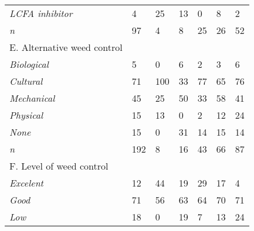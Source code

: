 \documentclass[
  12pt,
  a4paper]{article}
\begin{document}
\begin{table}[ht!]
\begin{tabular}{@{}lllllll@{}}
\hspace{3mm}\textit{LCFA inhibitor}                & 4      & 25    & 13        & 0       & 8         & 2     \\
\hspace{3mm}\textit{n}                             & 97     & 4     & 8         & 25      & 26        & 52    \\
E. Alternative weed control            &        &       &           &         &           &       \\
\hspace{3mm}\textit{Biological}                    & 5      & 0     & 6         & 2       & 3         & 6     \\
\hspace{3mm}\textit{Cultural}                      & 71     & 100   & 33        & 77      & 65        & 76    \\
\hspace{3mm}\textit{Mechanical}                    & 45     & 25    & 50        & 33      & 58        & 41    \\
\hspace{3mm}\textit{Physical}                               & 15     & 13    & 0         & 2       & 12        & 24    \\
\hspace{3mm}\textit{None}                                   & 15     & 0     & 31        & 14      & 15        & 14    \\
\hspace{3mm}\textit{n}                                      & 192    & 8     & 16        & 43      & 66        & 87    \\
F. Level of weed control               &        &       &           &         &           &       \\
\hspace{3mm}\textit{Excelent}                               & 12     & 44    & 19        & 29      & 17        & 4     \\
\hspace{3mm}\textit{Good}                                  & 71     & 56    & 63        & 64      & 70        & 71    \\
\hspace{3mm}\textit{Low}                                   & 18     & 0     & 19        & 7       & 13        & 24    \\ \bottomrule
\end{tabular}
\end{table}
\end{document}
